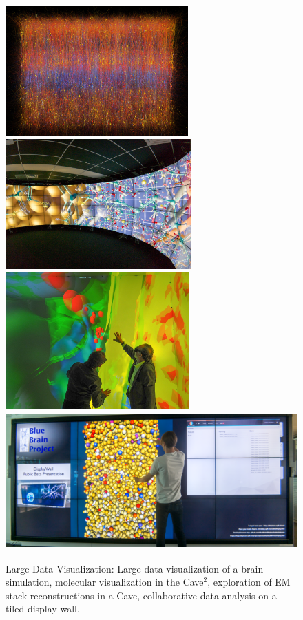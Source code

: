 \begin{figure}[ht]\label{FIG_teaser}
\includegraphics[height=5cm]{images/slices}\hfil%
\includegraphics[height=5cm]{images/cave2}\\%
\includegraphics[height=5.27cm]{images/cave}\hfil%
\includegraphics[height=5.27cm]{images/tide}%
\caption{Large Data Visualization: Large data visualization of a
      brain simulation, molecular visualization in the Cave$^2$, exploration of EM
      stack reconstructions in a Cave, collaborative data analysis on a tiled
      display wall.}
\end{figure}


